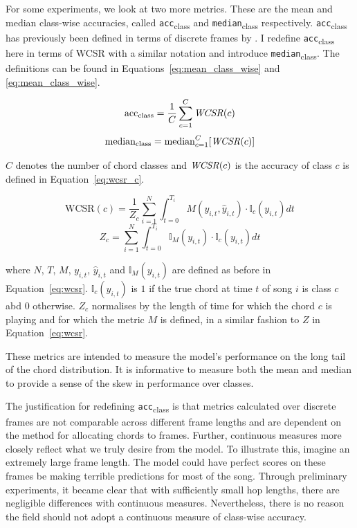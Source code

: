 For some experiments, we look at two more metrics. These are the mean and median class-wise accuracies, called \texttt{acc}\textsubscript{class} and \texttt{median}\textsubscript{class} respectively. \texttt{acc}\textsubscript{class} has previously been defined in terms of discrete frames by \citet{ACRLargeVocab1}. I redefine \texttt{acc}\textsubscript{class} here in terms of WCSR with a similar notation and introduce \texttt{median}\textsubscript{class}. The definitions can be found in Equations~\ref{eq:mean_class_wise} and \ref{eq:mean_class_wise}.

\begin{equation}\label{eq:mean_class_wise}
    \text{acc}\textsubscript{class} = \frac{1}{C} \sum_{c=1}^{C} \text{\emph{WCSR}}(c)
\end{equation}
\begin{equation}\label{eq:median_class_wise}
    \text{median}\textsubscript{class} = \text{median}_{c=1}^{C} [\text{\emph{WCSR}}(c)]
\end{equation}

$C$ denotes the number of chord classes and $\text{\emph{WCSR}}(c)$ is the accuracy of class $c$ is defined in Equation~\ref{eq:wcsr_c}.

\begin{equation}\label{eq:wcsr_c}
    \text{WCSR}(c) = \frac{1}{Z_c}\sum_{i=1}^{N} \int_{t=0}^{T_i} M(y_{i,t},\hat{y}_{i,t}) \cdot \mathbb{I}_c(y_{i,t}) dt
\end{equation}
\begin{equation}
    Z_c = \sum_{i=1}^{N} \int_{t=0}^{T_i} \mathbb{I}_M(y_{i,t})\cdot \mathbb{I}_c(y_{i,t}) dt
\end{equation}

where $N$, $T$, $M$, $y_{i,t}$, $\hat{y}_{i,t}$ and $\mathbb{I}_M(y_{i,t})$ are defined as before in Equation~\ref{eq:wcsr}. $\mathbb{I}_c(y_{i,t})$ is $1$ if the true chord at time $t$ of song $i$ is class $c$ abd $0$ otherwise. $Z_c$ normalises by the length of time for which the chord $c$ is playing and for which the metric $M$ is defined, in a similar fashion to $Z$ in Equation~\ref{eq:wcsr}.

These metrics are intended to measure the model's performance on the long tail of the chord distribution. It is informative to measure both the mean and median to provide a sense of the skew in performance over classes.

The justification for redefining \texttt{acc}\textsubscript{class} is that metrics calculated over discrete frames are not comparable across different frame lengths and are dependent on the method for allocating chords to frames. Further, continuous measures more closely reflect what we truly desire from the model. To illustrate this, imagine an extremely large frame length. The model could have perfect scores on these frames be making terrible predictions for most of the song. Through preliminary experiments, it became clear that with sufficiently small hop lengths, there are negligible differences with continuous measures. Nevertheless, there is no reason the field should not adopt a continuous measure of class-wise accuracy.

